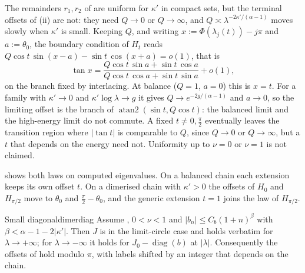 \begin{remark}\label{rem:finiteQ}
The remainders $r_1,r_2$ of  are uniform for $\kappa'$ in compact sets, but the terminal
offsets of (ii) are not: they need $Q\to0$ or $Q\to\infty$, and $Q\asymp\lambda^{-2\kappa'/(\alpha-1)}$
moves slowly when $\kappa'$ is small. Keeping $Q$, and writing $x:=\Phi(\lambda_j(t))-j\pi$ and $a:=\theta_0$,
the boundary condition of $H_t$ reads $Q\cos t\,\sin(x-a)-\sin t\,\cos(x+a)=o(1)$, that is
\[
  \tan x=\frac{Q\cos t\,\sin a+\sin t\,\cos a}{Q\cos t\,\cos a+\sin t\,\sin a}+o(1),
\]
on the branch fixed by interlacing. At balance ($Q=1$, $a=0$) this is $x=t$. For a family with
$\kappa'\to0$ and $\kappa'\log\lambda\to g$ it gives $Q\to e^{-2g/(\alpha-1)}$ and $a\to0$, so the limiting offset is
the branch of $\operatorname{atan2}(\sin t,Q\cos t)$: the balanced limit and the high-energy limit do not
commute. A fixed $t\ne0,\frac\pi2$ eventually leaves the transition region where $|\tan t|$ is comparable to $Q$,
since $Q\to0$ or $Q\to\infty$, but a $t$ that depends on the energy need not. Uniformity up to
$\nu=0$ or $\nu=1$ is not claimed.
\end{remark}

 shows both laws on computed eigenvalues. On a balanced chain each extension
keeps its own offset $t$. On a dimerised chain with $\kappa'>0$ the offsets of $H_0$ and
$H_{\pi/2}$ move to $\theta_0$ and $\frac\pi2-\theta_0$, and the generic extension $t=1$ joins
the law of $H_{\pi/2}$.

%

\begin{theorem}{Small diagonal}{dimerdiag}
Assume , $0<\nu<1$ and $|b_n|\le C_b(1+n)^\beta$ with $\beta<\alpha-1-2|\kappa'|$.
Then $J$ is in the limit-circle case and  holds verbatim for
$\lambda\to+\infty$; for $\lambda\to-\infty$ it holds for $J_0-\operatorname{diag}(b)$ at $|\lambda|$. Consequently the
offsets of  hold modulo $\pi$, with labels shifted by an integer that
depends on the chain.
\end{theorem}

